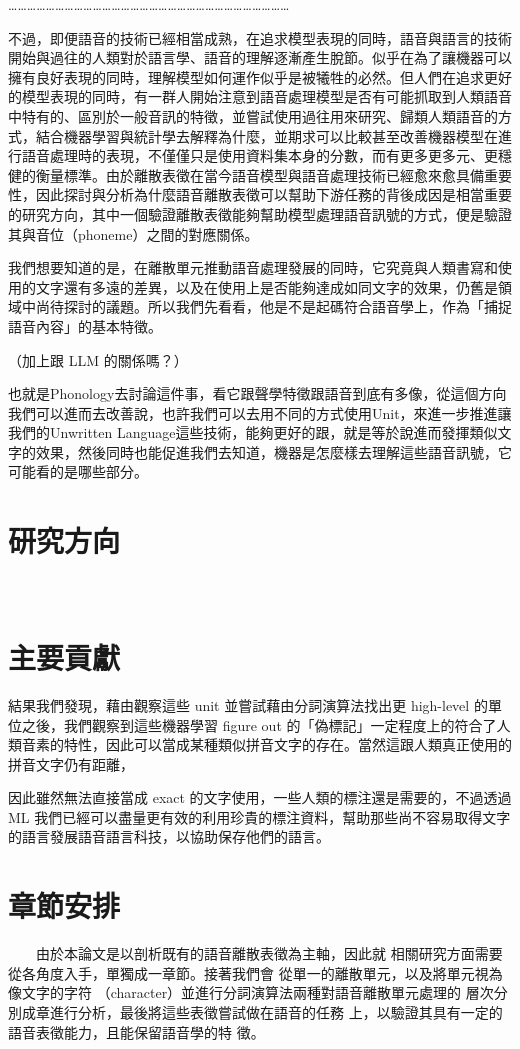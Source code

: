     ………………………………………………………………………………

   不過，即便語音的技術已經相當成熟，在追求模型表現的同時，語音與語言的技術開始與過往的人類對於語言學、語音的理解逐漸產生脫節。似乎在為了讓機器可以擁有良好表現的同時，理解模型如何運作似乎是被犧牲的必然。但人們在追求更好的模型表現的同時，有一群人開始注意到語音處理模型是否有可能抓取到人類語音中特有的、區別於一般音訊的特徵，並嘗試使用過往用來研究、歸類人類語音的方式，結合機器學習與統計學去解釋為什麼，並期求可以比較甚至改善機器模型在進行語音處理時的表現，不僅僅只是使用資料集本身的分數，而有更多更多元、更穩健的衡量標準。由於離散表徵在當今語音模型與語音處理技術已經愈來愈具備重要性，因此探討與分析為什麼語音離散表徵可以幫助下游任務的背後成因是相當重要的研究方向，其中一個驗證離散表徵能夠幫助模型處理語音訊號的方式，便是驗證其與音位（phoneme）之間的對應關係。

    我們想要知道的是，在離散單元推動語音處理發展的同時，它究竟與人類書寫和使用的文字還有多遠的差異，以及在使用上是否能夠達成如同文字的效果，仍舊是領域中尚待探討的議題。所以我們先看看，他是不是起碼符合語音學上，作為「捕捉語音內容」的基本特徵。


（加上跟 LLM 的關係嗎？）


也就是Phonology去討論這件事，看它跟聲學特徵跟語音到底有多像，從這個方向我們可以進而去改善說，也許我們可以去用不同的方式使用Unit，來進一步推進讓我們的Unwritten Language這些技術，能夠更好的跟，就是等於說進而發揮類似文字的效果，然後同時也能促進我們去知道，機器是怎麼樣去理解這些語音訊號，它可能看的是哪些部分。







\section{研究方向}
　　
\section{主要貢獻}  %

結果我們發現，藉由觀察這些 unit 並嘗試藉由分詞演算法找出更 high-level 的單位之後，我們觀察到這些機器學習 figure out 的「偽標記」一定程度上的符合了人類音素的特性，因此可以當成某種類似拼音文字的存在。當然這跟人類真正使用的拼音文字仍有距離，

因此雖然無法直接當成 exact 的文字使用，一些人類的標注還是需要的，不過透過 ML 我們已經可以盡量更有效的利用珍貴的標注資料，幫助那些尚不容易取得文字的語言發展語音語言科技，以協助保存他們的語言。


\section{章節安排}

　　由於本論文是以剖析既有的語音離散表徵為主軸，因此就
相關研究方面需要從各角度入手，單獨成一章節。接著我們會
從單一的離散單元，以及將單元視為像文字的字符
（character）並進行分詞演算法兩種對語音離散單元處理的
層次分別成章進行分析，最後將這些表徵嘗試做在語音的任務
上，以驗證其具有一定的語音表徵能力，且能保留語音學的特
徵。
